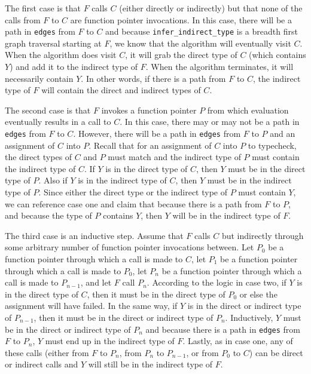 The first case is that $F$ calls $C$ (either directly or indirectly) but that none of the calls from $F$ to $C$ are function pointer invocations.  In this case, there will be a path in \lstinline{edges} from $F$ to $C$ and because \lstinline{infer_indirect_type} is a breadth first graph traversal starting at $F$, we know that the algorithm will eventually visit $C$.  When the algorithm does visit $C$, it will grab the direct type of $C$ (which contains $Y$) and add it to the indirect type of $F$.  When the algorithm terminates, it will necessarily contain $Y$.  In other words, if there is a path from $F$ to $C$, the indirect type of $F$ will contain the direct and indirect types of $C$.

The second case is that $F$ invokes a function pointer $P$ from which evaluation eventually results in a call to $C$.  In this case, there may or may not be a path in \lstinline{edges} from $F$ to $C$.  However, there will be a path in \lstinline{edges} from $F$ to $P$ and an assignment of $C$ into $P$.  Recall that for an assignment of $C$ into $P$ to typecheck, the direct types of $C$ and $P$ must match and the indirect type of $P$ must contain the indirect type of $C$.  If $Y$ is in the direct type of $C$, then $Y$ must be in the direct type of $P$.  Also if $Y$ is in the indirect type of $C$, then $Y$ must be in the indirect type of $P$.  Since either the direct type or the indirect type of $P$ must contain $Y$, we can reference case one and claim that because there is a path from $F$ to $P$, and because the type of $P$ contains $Y$, then $Y$ will be in the indirect type of $F$.  

The third case is an inductive step.  Assume that $F$ calls $C$ but indirectly through some arbitrary number of function pointer invocations between.  Let $P_0$ be a function pointer through which a call is made to $C$, let $P_1$ be a function pointer through which a call is made to $P_0$, let $P_n$ be a function pointer through which a call is made to $P_{n-1}$, and let $F$ call $P_n$.  According to the logic in case two, if $Y$ is in the direct type of $C$, then it must be in the direct type of $P_0$ or else the assignment will have failed.  In the same way, if $Y$ is in the direct or indirect type of $P_{n-1}$, then it must be in the direct or indirect type of $P_{n}$.  Inductively, $Y$ must be in the direct or indirect type of $P_n$ and because there is a path in \lstinline{edges} from $F$ to $P_n$, $Y$ must end up in the indirect type of $F$.  Lastly, as in case one, any of these calls (either from $F$ to $P_n$, from $P_n$ to $P_{n-1}$, or from $P_0$ to $C$) can be direct or indirect calls and $Y$ will still be in the indirect type of $F$.

